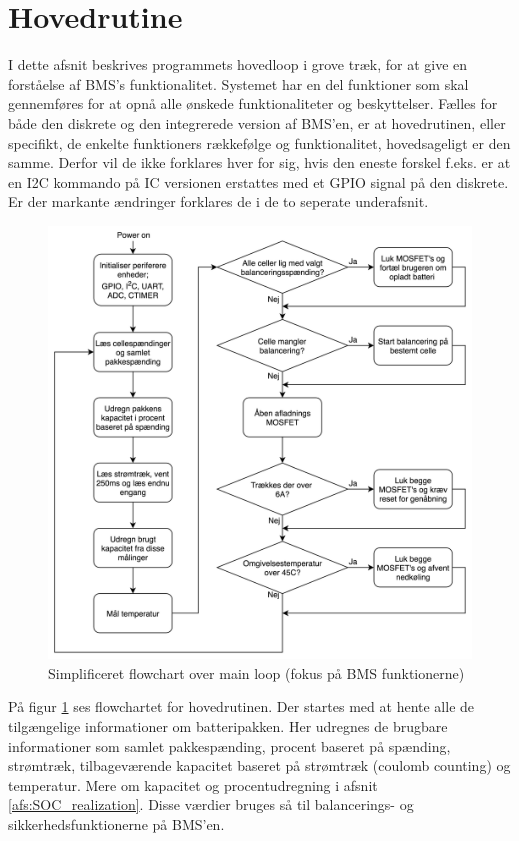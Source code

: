 \section{Hovedrutine}
I dette afsnit beskrives programmets hovedloop i grove træk, for at give en forståelse af BMS's funktionalitet. Systemet har en del funktioner som skal gennemføres for at opnå alle ønskede funktionaliteter og beskyttelser. Fælles for både den diskrete og den integrerede version af BMS'en, er at hovedrutinen, eller specifikt, de enkelte funktioners rækkefølge og funktionalitet, hovedsageligt er den samme. Derfor vil de ikke forklares hver for sig, hvis den eneste forskel f.eks. er at en I2C kommando på IC versionen erstattes med et GPIO signal på den diskrete. Er der markante ændringer forklares de i de to seperate underafsnit. \\

\begin{figure}[h]
	\centering
	\includegraphics[width=15cm]{billeder/main_loop_bms_functions.png}
	\caption{Simplificeret flowchart over main loop (fokus på BMS funktionerne)}
	\label{fig:main_loop}
\end{figure}

På figur \ref{fig:main_loop} ses flowchartet for hovedrutinen. Der startes med at hente alle de tilgængelige informationer om batteripakken. Her udregnes de brugbare informationer som samlet pakkespænding, procent baseret på spænding, strømtræk, tilbageværende kapacitet baseret på strømtræk (coulomb counting) og temperatur. Mere om kapacitet og procentudregning i afsnit \ref{afs:SOC_realization}. Disse værdier bruges så til balancerings- og sikkerhedsfunktionerne på BMS'en. \\

